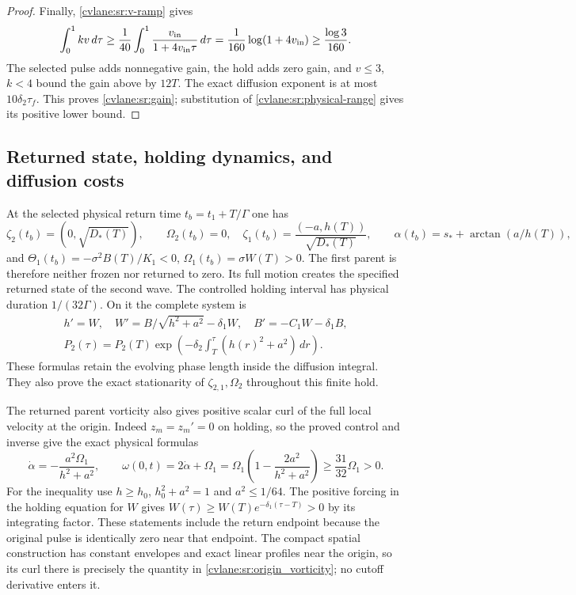 \begin{proof}
Finally, \eqref{cvlane:sr:v-ramp} gives
\[
 \int_0^1kv\,d\tau\geq
 \frac1{40}\int_0^1
 \frac{v_{\rm in}}{1+4v_{\rm in}\tau}\,d\tau
 =\frac1{160}\log(1+4v_{\rm in})
 \geq\frac{\log3}{160}.
\]
The selected pulse adds nonnegative gain, the hold adds zero gain,
and $v\leq3$, $k<4$ bound the gain above by $12T$.
The exact diffusion exponent is at most $10\delta_2\tau_f$.
This proves \eqref{cvlane:sr:gain}; substitution of
\eqref{cvlane:sr:physical-range} gives its positive lower bound.
\end{proof}

\subsection{Returned state, holding dynamics, and diffusion costs}

At the selected physical return time $t_b=t_1+T/\Gamma$ one has
\[
 \zeta_2(t_b)=(0,\sqrt{D_*(T)}),\qquad\Omega_2(t_b)=0,
 \quad\zeta_1(t_b)=\frac{(-a,h(T))}{\sqrt{D_*(T)}},\qquad
 \alpha(t_b)=s_*+\arctan(a/h(T)),
\]
and $\Theta_1(t_b)=-\sigma^2B(T)/K_1<0$,
$\Omega_1(t_b)=\sigma W(T)>0$. The first parent is therefore
neither frozen nor returned to zero. Its full motion creates the
specified returned state of the second wave.
The controlled holding interval has physical duration $1/(32\Gamma)$.
On it the complete system is
\[
 \begin{gathered}
 h'=W,\quad W'=B/\sqrt{h^2+a^2}-\delta_1W,
 \quad B'=-C_1W-\delta_1B,\\
 P_2(\tau)=P_2(T)\exp\!\left(-\delta_2
                  \int_T^\tau(h(r)^2+a^2)\,dr\right).
 \end{gathered}
\]
These formulas retain the evolving phase length inside the diffusion
integral. They also prove the exact stationarity of
$\zeta_{2,1},\Omega_2$ throughout this finite hold.

The returned parent vorticity also gives positive scalar curl of the
full local velocity at the origin. Indeed $z_m=z_m'=0$ on holding,
so the proved control and inverse give the exact physical formulas
\begin{equation}\label{cvlane:sr:origin_vorticity}
 \dot\alpha=-\frac{a^2\Omega_1}{h^2+a^2},\qquad
 \omega(0,t)=2\dot\alpha+\Omega_1
   =\Omega_1\left(1-\frac{2a^2}{h^2+a^2}\right)
   \geq\frac{31}{32}\Omega_1>0.
\end{equation}
For the inequality use $h\geq h_0$, $h_0^2+a^2=1$ and
$a^2\leq1/64$. The positive forcing in the holding equation for
$W$ gives $W(\tau)\geq W(T)e^{-\delta_1(\tau-T)}>0$ by its
integrating factor. These statements include the return endpoint
because the original pulse is identically zero near that endpoint.
The compact spatial construction has constant envelopes and exact
linear profiles near the origin, so its curl there is precisely the
quantity in \eqref{cvlane:sr:origin_vorticity}; no cutoff derivative enters it.

